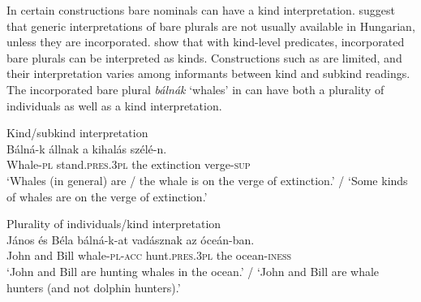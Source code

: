 \documentclass[output=paper]{langscibook}
\begin{document}
\noindent In certain constructions bare nominals can have a kind interpretation. \citet{farkas-deswart-03} suggest that generic interpretations of bare plurals are not usually available in Hungarian, unless they are incorporated. \citet{schvarcz-rothstein-17} show that with kind-level predicates, incorporated bare plurals can be interpreted as kinds. Constructions such as  are limited, and their interpretation varies among informants between kind and subkind readings. The incorporated bare plural \textit{bálnák} `whales' in  can have both a plurality of individuals as well as a kind interpretation.

\ea Kind/subkind interpretation\label{schv-nem:ex:39}\\
\gll Bálná-k állnak a kihalás szélé-n.	\\
Whale-\textsc{pl} stand.\textsc{pres}.\textsc{3pl} the  extinction verge-\textsc{sup}\\ %
\glt `Whales (in general) are / the whale is on the verge of extinction.' / `Some kinds of whales are on the verge of extinction.'  \\\hfill  \citep[p. 188, (13)]{schvarcz-rothstein-17}


\ex Plurality of individuals/kind interpretation\label{schv-nem:ex:40}\\
\gll János és Béla bálná-k-at vadásznak az óceán-ban.	\\
John and Bill whale-\textsc{pl}-\textsc{acc} hunt.\textsc{pres}.\textsc{3pl} the ocean-\textsc{iness}\\ %
\glt `John and Bill are hunting whales in the ocean.' / `John and Bill are whale hunters (and not dolphin hunters).'
\z

\end{document}

